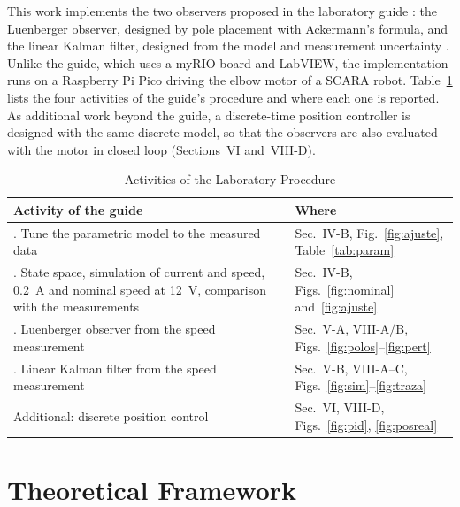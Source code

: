 \documentclass[conference,a4paper]{IEEEtran}
\begin{document}
This work implements the two observers proposed in the laboratory guide \cite{guia,guiaeia}: the Luenberger observer, designed by pole placement with Ackermann's formula, and the linear Kalman filter, designed from the model and measurement uncertainty \cite{welch}. Unlike the guide, which uses a myRIO board and LabVIEW, the implementation runs on a Raspberry Pi Pico driving the elbow motor of a SCARA robot. Table~\ref{tab:actividades} lists the four activities of the guide's procedure and where each one is reported. As additional work beyond the guide, a discrete-time position controller is designed with the same discrete model, so that the observers are also evaluated with the motor in closed loop (Sections~VI and~VIII-D).

\begin{table}[!t]
\centering
\caption{Activities of the Laboratory Procedure}
\label{tab:actividades}
\begin{tabular}{>{\raggedright\arraybackslash}p{}>{\raggedright\arraybackslash}p{}}
\toprule
Activity of the guide \cite{guia} & Where \\
\midrule
1. Tune the parametric model to the measured data & Sec.~IV-B, Fig.~\ref{fig:ajuste}, Table~\ref{tab:param} \\
2. State space, simulation of current and speed, \SI{0.2}{A} and nominal speed at \SI{12}{V}, comparison with the measurements & Sec.~IV-B, Figs.~\ref{fig:nominal} and~\ref{fig:ajuste} \\
3. Luenberger observer from the speed measurement & Sec.~V-A, VIII-A/B, Figs.~\ref{fig:polos}--\ref{fig:pert} \\
4. Linear Kalman filter from the speed measurement & Sec.~V-B, VIII-A--C, Figs.~\ref{fig:sim}--\ref{fig:traza} \\
Additional: discrete position control & Sec.~VI, VIII-D, Figs.~\ref{fig:pid}, \ref{fig:posreal} \\
\bottomrule
\end{tabular}
\end{table}

\section{Theoretical Framework}
\end{document}

